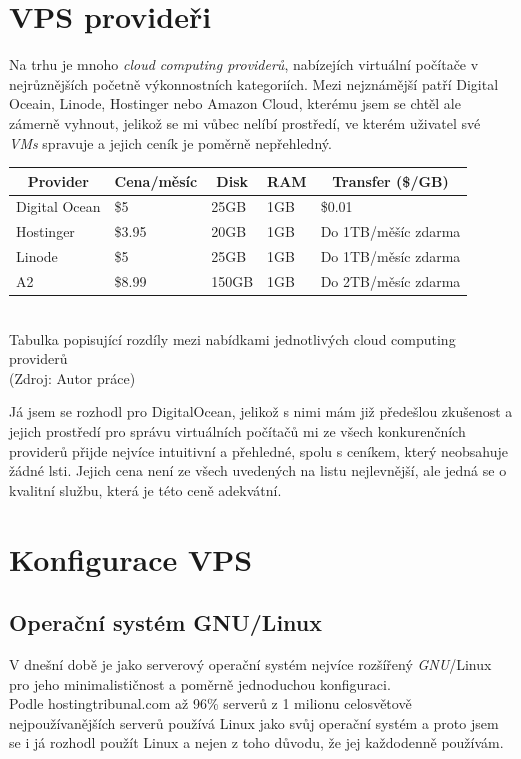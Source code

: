 \documentclass[12pt,a4paper]{report}
\begin{document}
  \section{VPS provideři}
  Na trhu je mnoho \emph{cloud computing providerů}, nabízejích virtuální počítače
  v nejrůznějších početně výkonnostních kategoriích. Mezi nejznámější patří Digital Oceain,
  Linode, Hostinger nebo Amazon Cloud, kterému jsem se chtěl ale zámerně vyhnout, jelikož se mi vůbec nelíbí 
  prostředí, ve kterém uživatel své \emph{VMs} spravuje a jejich ceník je poměrně nepřehledný.
  \begin{center}
    \noindent\begin{tabular}{|l|l|l|l|l|}
      \multicolumn{1}{c}{\bfseries Provider} & \multicolumn{1}{c}{\bfseries Cena/měsíc} & \multicolumn{1}{c}{\bfseries Disk} & \multicolumn{1}{c}{\bfseries RAM} & \multicolumn{1}{c}{\bfseries Transfer (\$/GB)} \\ \hline
      Digital Ocean & \$5 & 25GB & 1GB & \$0.01 \\ \hline
      Hostinger & \$3.95 & 20GB & 1GB & Do 1TB/měšíc zdarma \\ \hline
      Linode & \$5 & 25GB & 1GB & Do 1TB/měsíc zdarma \\ \hline
      A2 & \$8.99 & 150GB & 1GB & Do 2TB/měsíc zdarma \\ \hline
    \end{tabular}\\
    \vspace{0.5cm}
    Tabulka popisující rozdíly mezi nabídkami jednotlivých cloud computing providerů  \\
    (Zdroj: Autor práce)
  \end{center}
  Já jsem se rozhodl pro DigitalOcean, jelikož s nimi mám již předešlou 
  zkušenost a jejich prostředí pro správu virtuálních počítačů mi ze všech 
  konkurenčních providerů přijde nejvíce intuitivní a přehledné, spolu s ceníkem, 
  který neobsahuje žádné lsti. Jejich cena není ze všech uvedených na listu nejlevnější,
  ale jedná se o kvalitní službu, která je této ceně adekvátní.  
  \section{Konfigurace VPS}
  \subsection{Operační systém GNU/Linux}
  V dnešní době je jako serverový operační systém nejvíce rozšířený \emph{GNU}/Linux pro jeho
  minimalističnost a poměrně jednoduchou konfiguraci.\\ Podle hostingtribunal.com až 96\% serverů z
  1 milionu celosvětově nejpoužívanějších serverů používá Linux jako svůj operační systém a proto
  jsem se i já rozhodl použít Linux a nejen z toho důvodu, že jej každodenně používám.
\end{document}
